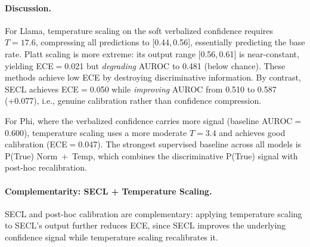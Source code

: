 \paragraph{Discussion.}
For Llama, temperature scaling on the soft verbalized confidence requires 
$T{=}17.6$, compressing all predictions to [0.44,\,0.56], essentially 
predicting the base rate.
Platt scaling is more extreme: its output range [0.56,\,0.61] is near-constant,
yielding ECE$=$0.021 but \emph{degrading} AUROC to 0.481 (below chance).
These methods achieve low ECE by destroying discriminative information.
By contrast, SECL achieves ECE$=$0.050 while \emph{improving} AUROC
from 0.510 to 0.587 (+0.077), i.e., genuine calibration rather
than confidence compression.

For Phi, where the verbalized confidence carries more signal 
(baseline AUROC$=$0.600), temperature scaling uses a more moderate 
$T{=}3.4$ and achieves good calibration (ECE$=$0.047).
The strongest supervised baseline across all models is P(True) Norm~+~Temp,
which combines the discriminative P(True) signal with post-hoc recalibration.

\paragraph{Complementarity: SECL + Temperature Scaling.}
SECL and post-hoc calibration are complementary: applying temperature 
scaling to SECL's output further reduces ECE, since SECL improves the 
underlying confidence signal while temperature scaling recalibrates it.

